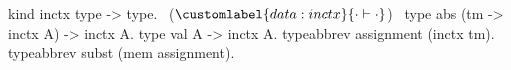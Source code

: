   kind inctx type -> type.                              ~($\customlabel{data:inctx}{\cdot\vdash\cdot}$)~
  type abs (tm -> inctx A) -> inctx A.
  type val A -> inctx A.
  typeabbrev assignment (inctx tm).
  typeabbrev subst (mem assignment).
